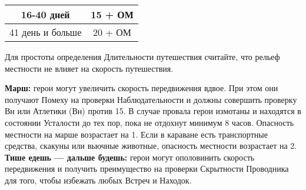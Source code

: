 \begin{enumerate}
\begin{center}
\begin{tabular}{|c|c|}
16-40 дней & 15 + ОМ \\ \hline
41 день и больше & 20 + ОМ \\ \hline
\end{tabular}
\end{center}
\begin{tcolorbox}
Для простоты определения Длительности путешествия считайте, что рельеф местности не влияет на скорость путешествия.
\end{tcolorbox}
\textbf{Марш:} герои могут увеличить скорость передвижения вдвое. При этом они получают Помеху на проверки Наблюдательности и должны совершить проверку Вн или Атлетики (Вн) против 15. В случае провала герои измотаны и находятся в состоянии Усталости до тех пор, пока не отдохнут минимум 8 часов. Опасность местности на марше возрастает на 1. Если в караване есть транспортные средства, скакуны или вьючные животные, опасность местности возрастает на 2.
\newline \textbf{Тише едешь — дальше будешь:} герои могут ополовинить скорость передвижения и получить преимущество на проверки Скрытности Проводника для того, чтобы избежать любых Встреч и Находок.


\end{enumerate}
